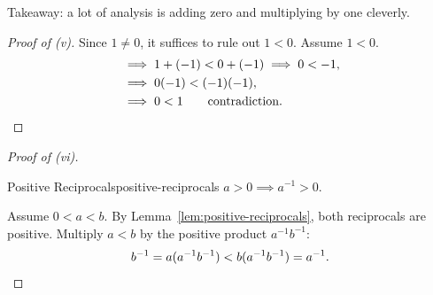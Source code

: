 \begin{thinking}
  Takeaway: a lot of analysis is adding zero
  and multiplying by one cleverly.
\end{thinking}

\begin{proof}[Proof of (v)]
  Since $1\ne0$, it suffices to rule out $1<0$. Assume $1<0$.
  \begin{align*}
     & \implies 1+(-1)<0+(-1)\implies 0<-1,            \\
     & \implies 0(-1)<(-1)(-1),                        \\
     & \implies 0<1\qquad\text{contradiction.}\qedhere
  \end{align*}
\end{proof}

\begin{proof}[Proof of (vi)]
  \begin{lemma}{Positive Reciprocals}{positive-reciprocals}
    $a>0\implies a^{-1}>0$.
  \end{lemma}
  Assume $0<a<b$. By Lemma~\ref{lem:positive-reciprocals}, both reciprocals are positive.
  Multiply $a<b$ by the positive product $a^{-1}b^{-1}$:
  \[
    b^{-1}=a(a^{-1}b^{-1})<b(a^{-1}b^{-1})=a^{-1}.\qedhere
  \]
\end{proof}
